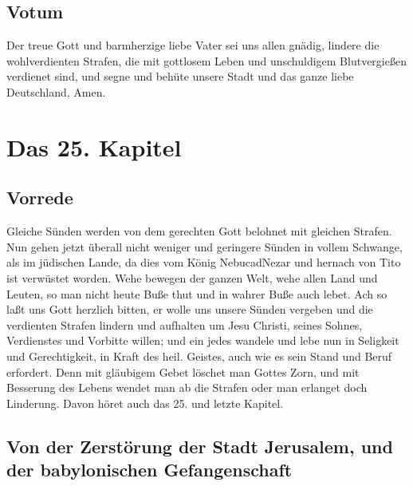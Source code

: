 \section{Votum}

Der treue Gott und barmherzige liebe Vater sei uns allen gnädig, lindere die wohlverdienten Strafen, die mit gottlosem Leben und unschuldigem Blutvergießen verdienet sind, und segne und behüte unsere Stadt und das ganze liebe Deutschland, Amen.

\chapter{Das 25. Kapitel}

\section{Vorrede}

Gleiche Sünden werden von dem gerechten Gott belohnet mit gleichen Strafen. Nun gehen jetzt überall nicht weniger und geringere Sünden in vollem Schwange, als im jüdischen Lande, da dies vom König NebucadNezar und hernach von Tito ist verwüstet worden. Wehe bewegen der ganzen Welt, wehe allen Land und Leuten, so man nicht heute Buße thut und in wahrer Buße auch lebet. Ach so laßt uns Gott herzlich bitten, er wolle uns unsere Sünden vergeben und die verdienten Strafen lindern und aufhalten um Jesu Christi, seines Sohnes, Verdienstes und Vorbitte willen; und ein jedes wandele und lebe nun in Seligkeit und Gerechtigkeit, in Kraft des heil. Geistes, auch wie es sein Stand und Beruf erfordert. Denn mit gläubigem Gebet löschet man Gottes Zorn, und mit Besserung des Lebens wendet man ab die Strafen oder man erlanget doch Linderung. Davon höret auch das 25. und letzte Kapitel.

\section[Von der Zerstörung der Stadt Jerusalem, und der]{Von der Zerstörung der Stadt Jerusalem, und der babylonischen Gefangenschaft}

